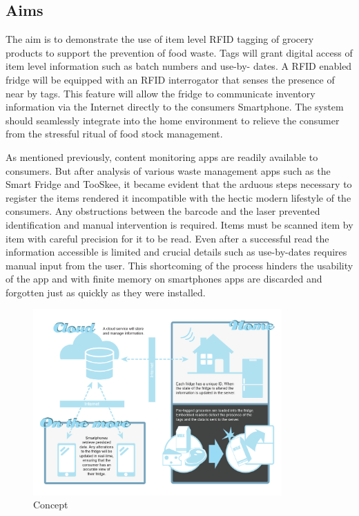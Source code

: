 \documentclass[a4paper, 11pt]{article}
\begin{document}
\subsection{Aims}

The aim is to demonstrate the use of item level RFID tagging of grocery products to support the prevention of food waste. Tags will grant digital access of item level information such as batch numbers and use-by- dates. A RFID enabled fridge will be equipped with an RFID interrogator that senses the presence of near by tags. This feature will allow the fridge to communicate inventory information via the Internet directly to the consumers Smartphone. The system should seamlessly integrate into the home environment to relieve the consumer from the stressful ritual of food stock management.

As mentioned previously, content monitoring apps are readily available to consumers. But after analysis of various waste management apps such as the Smart Fridge and TooSkee, it became evident that the arduous steps necessary to register the items rendered it incompatible with the hectic modern lifestyle of the consumers. Any obstructions between the barcode and the laser prevented identification and manual intervention is required. Items must be scanned item by item with careful precision for it to be read. Even after a successful read the information accessible is limited and crucial details such as use-by-dates requires manual input from the user. This shortcoming of the process hinders the usability of the app and with finite memory on smartphones apps are discarded and forgotten just as quickly as they were installed.

\begin{figure}[h!]
  \centering
    \includegraphics[width=0.85\textwidth]{system2.png}
      \caption{Concept}
\end{figure}
\end{document}
